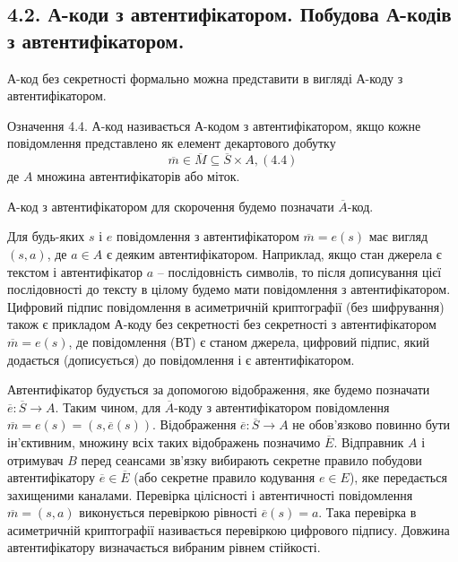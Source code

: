 \subsection{4.2. А-коди з автентифікатором. Побудова А-кодів з автентифікатором.}

А-код без секретності формально можна представити в вигляді А-коду з
автентифікатором.

\begin{definition}
    Означення 4.4. А-код називається А-кодом з автентифікатором, якщо
    кожне повідомлення представлено як елемент декартового добутку
    \begin{equation*}
        \overline{m} \in \overline{M} \subseteq \overline{S} \times A, (4.4)
    \end{equation*}
    де $A$ множина автентифікаторів або міток.
    
    А-код з автентифікатором для скорочення будемо позначати $\overline{A}$-код.
\end{definition}

Для будь-яких $s$ і $e$ повідомлення з автентифікатором $\overline{m} = e(s)$ має вигляд
$(s, a)$, де $a \in A$ є деяким автентифікатором. Наприклад, якщо стан джерела є
текстом і автентифікатор $a$ -- послідовність символів, то після дописування цієї
послідовності до тексту в цілому будемо мати повідомлення з
автентифікатором. Цифровий підпис повідомлення в асиметричній
криптографії (без шифрування) також є прикладом А-коду без секретності без
секретності з автентифікатором $\overline{m} = e(s)$, де повідомлення (ВТ) є станом
джерела, цифровий підпис, який додається (дописується) до повідомлення і є
автентифікатором.

Автентифікатор будується за допомогою відображення, яке будемо
позначати $\overline{e}: \overline{S} \rightarrow A$. Таким чином, для $\overline{A}$-коду з автентифікатором
повідомлення $\overline{m} = e(s) = (s, \overline{e}(s))$. Відображення $\overline{e}: \overline{S} \rightarrow A$ не обов’язково
повинно бути ін’єктивним, множину всіх таких відображень позначимо $\overline{E}$.
Відправник $A$ і отримувач $B$ перед сеансами зв’язку вибирають секретне
правило побудови автентифікатору $\overline{e} \in \overline{E}$ (або секретне правило кодування $e \in E$),
яке передається захищеними каналами. Перевірка цілісності і автентичності
повідомлення $\overline{m} = (s, a)$ виконується перевіркою рівності $\overline{e}(s) = a$. Така
перевірка в асиметричній криптографії називається перевіркою цифрового
підпису. Довжина автентифікатору визначається вибраним рівнем стійкості.

